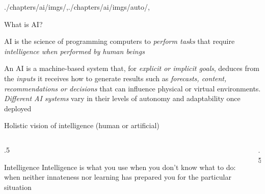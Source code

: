 \begin{graphicspathcontext}{{./chapters/ai/imgs/},{./chapters/ai/imgs/auto/},\old}

\begin{frame}[c]{What is AI?}
	\begin{definition}
		AI is the science of programming computers to \emph{perform tasks} that require \emph{intelligence when performed by human beings}
	\end{definition}
	\vspace{1cm}
	\begin{definition}
		An AI is a machine-based system that, for \emph{explicit or implicit goals}, deduces from the \emph{inputs} it receives how to generate results such as \emph{forecasts, content, recommendations or decisions} that can influence physical or virtual environments. \emph{Different AI systems} vary in their levels of autonomy and adaptability once deployed
	\end{definition}
\end{frame}


\begin{frame}[c]{Holistic vision of intelligence (human or artificial)}
	\begin{columns}
		\begin{column}{.5\linewidth}
			\begin{definitionblock}{Intelligence \cite{piaget1947psychologie}}
				Intelligence is what you use when you don't know what to do: when neither innateness nor learning has prepared you for the particular situation
			\end{definitionblock}
		\end{column}
		\begin{column}{.5\linewidth}
			\hfill
			 \\[.5cm]
			\hfill
		\end{column}
	\end{columns}
\end{frame}



\end{graphicspathcontext}

\endinput

